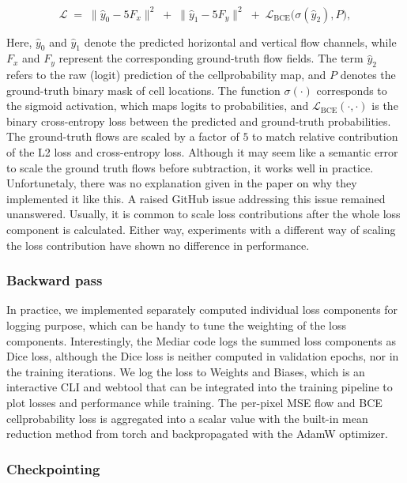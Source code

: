 \begin{equation} 
\mathcal{L} \;=\; \| \hat{y}_0 - 5 F_x \|^2 \;+\; \| \hat{y}_1 - 5 F_y \|^2 
\;+\; \mathcal{L}_{\text{BCE}} \bigl(\sigma(\hat{y}_2), P \bigr),
\end{equation}

Here, $\hat{y}_0$ and $\hat{y}_1$ denote the predicted horizontal and vertical flow channels, while $F_x$ and $F_y$ represent the corresponding ground-truth flow fields. The term $\hat{y}_2$ refers to the raw (logit) prediction of the cellprobability map, and $P$ denotes the ground-truth binary mask of cell locations. The function $\sigma(\cdot)$ corresponds to the sigmoid activation, which maps logits to probabilities, and $\mathcal{L}_{\text{BCE}}(\cdot,\cdot)$ is the binary cross-entropy loss between the predicted and ground-truth probabilities. The ground-truth flows are scaled by a factor of $5$ to match relative contribution of the L2 loss and cross-entropy loss. Although it may seem like a semantic error to scale the ground truth flows before subtraction, it works well in practice. Unfortunetaly, there was no explanation given in the paper on why they implemented it like this. A raised GitHub issue addressing this issue remained unanswered. Usually, it is common to scale loss contributions after the whole loss component is calculated. Either way, experiments with a different way of scaling the loss contribution have shown no difference in performance.  


\subsubsection{Backward pass}


In practice, we implemented separately computed individual loss components for logging purpose, which can be handy to tune the weighting of the loss components. Interestingly, the Mediar code logs the summed loss components as Dice loss, although the Dice loss is neither computed in validation epochs, nor in the training iterations. We log the loss to Weights and Biases, which is an interactive CLI and webtool that can be integrated into the training pipeline to plot losses and performance while training. The per-pixel MSE flow and BCE cellprobability loss is aggregated into a scalar value with the built-in mean reduction method from torch and backpropagated with the AdamW optimizer.

\subsubsection{Checkpointing}

